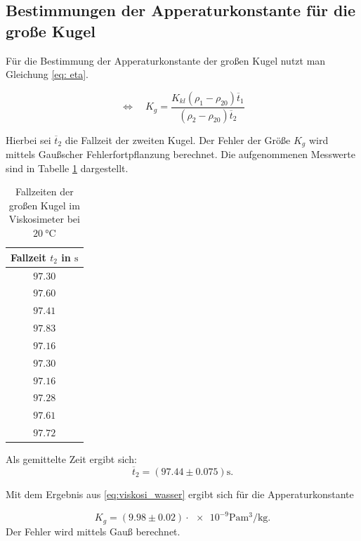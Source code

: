 \subsection{Bestimmungen der Apperaturkonstante für die große Kugel}
Für die Bestimmung der Apperaturkonstante der großen Kugel nutzt man Gleichung \eqref{eq: eta}.

\begin{equation*}
\Leftrightarrow \quad K_{g}=\frac{K_{kl}\left(\rho_1-\rho_{20}\right)\overline{t}_1}{\left(\rho_2-\rho_{20}\right)\overline{t}_2}
\end{equation*}

Hierbei sei $\overline{t}_2$ die Fallzeit der zweiten Kugel.
Der Fehler der Größe $K_{g}$ wird mittels Gaußscher Fehlerfortpflanzung berechnet.
Die aufgenommenen Messwerte sind in Tabelle \ref{tab:messwerte_fallzeit_kugel_gross} dargestellt.

\begin{table}
\centering
\begin{tabular} {c}
  \toprule
  Fallzeit $t_2$ in $\si{\second}$ \\
  \midrule
  $\num{97.30}$ \\
  $\num{97.60}$ \\
  $\num{97.41}$ \\
  $\num{97.83}$ \\
  $\num{97.16}$ \\
  $\num{97.30}$ \\
  $\num{97.16}$ \\
  $\num{97.28}$ \\
  $\num{97.61}$ \\
  $\num{97.72}$ \\
\bottomrule
\end{tabular}
\caption{Fallzeiten der großen Kugel im Viskosimeter bei $\SI{20}{\degreeCelsius}$}
\label{tab:messwerte_fallzeit_kugel_gross}
\end{table}

Als gemittelte Zeit ergibt sich:
\begin{equation}
\label{eq:gemittelte_fallzeit_gross}
\overline{t}_{2}=\left(\num{97.44}\pm\num{0.075}\right) \si{\second}.
\end{equation}

Mit dem Ergebnis aus \eqref{eq:viskosi_wasser} ergibt sich für die
Apperaturkonstante

\begin{equation}
\label{eq:app_konst_gross}
K_{g}=\left(\num{9.98}\pm\num{0.02}\right)\cdot{\num{e-9}} \si{\pascal\cubic\meter\per\kilogram}.
\end{equation}
Der Fehler wird mittels Gauß berechnet.

